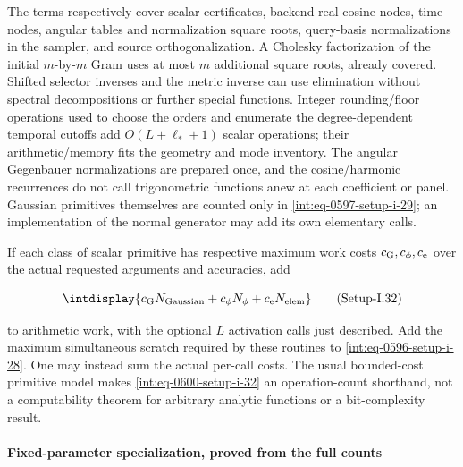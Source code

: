 The terms respectively cover scalar certificates, backend real cosine nodes, time nodes, angular tables and normalization square roots, query-basis normalizations in the sampler, and source orthogonalization. A Cholesky factorization of the initial \(m\)-by-\(m\) Gram uses at most \(m\) additional square roots, already covered. Shifted selector inverses and the metric inverse can use elimination without spectral decompositions or further special functions. Integer rounding/floor operations used to choose the orders and enumerate the degree-dependent temporal cutoffs add \(O(L+\ell_*+1)\) scalar operations; their arithmetic/memory fits the geometry and mode inventory. The angular Gegenbauer normalizations are prepared once, and the cosine/harmonic recurrences do not call trigonometric functions anew at each coefficient or panel. Gaussian primitives themselves are counted only in \hyperref[int:eq-setup-i-29]{\eqref{int:eq-0597-setup-i-29}}; an implementation of the normal generator may add its own elementary calls.



If each class of scalar primitive has respective maximum work costs \(c_{\rm G},\allowbreak c_\phi,\allowbreak c_{\rm e}\) over the actual requested arguments and accuracies, add


\label{int:eq-setup-i-32}
\begingroup\renewcommand{\theHequation}{intdisplay.1117}
\begin{equation}
\intdisplay{
c_{\rm G}N_{\rm Gaussian}+c_\phi N_\phi+c_{\rm e}N_{\rm elem}
}
\tag{Setup-I.32}
\label{int:eq-0600-setup-i-32}
\end{equation}
\endgroup


to arithmetic work, with the optional \(L\) activation calls just described. Add the maximum simultaneous scratch required by these routines to \hyperref[int:eq-setup-i-28]{\eqref{int:eq-0596-setup-i-28}}. One may instead sum the actual per-call costs. The usual bounded-cost primitive model makes \hyperref[int:eq-setup-i-32]{\eqref{int:eq-0600-setup-i-32}} an operation-count shorthand, not a computability theorem for arbitrary analytic functions or a bit-complexity result.


\paragraph{Fixed-parameter specialization, proved from the full counts}
\label{int:setup-implicit-7}
\mbox{}\par\smallskip


